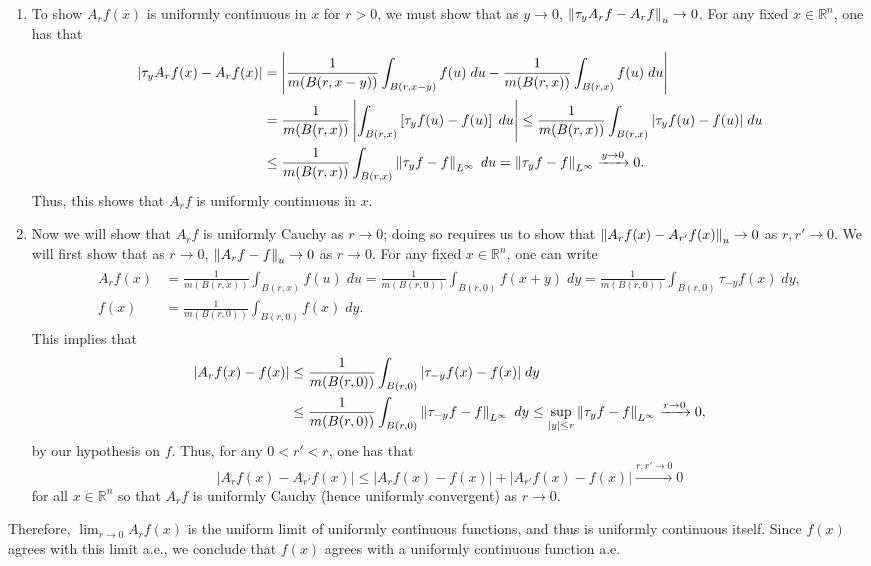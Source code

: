 \documentclass{article}
\begin{document}
	\begin{enumerate}[itemsep =-2pt,label = (\arabic{*})]
		\item To show $A_{r}f(x)$ is uniformly continuous in $x$ for $r > 0$, we must show that as $y \to 0$, $\left\Vert \tau_{y}A_{r}f - A_{r}f \right\Vert_{u} \to 0$. For any fixed $x \in \mathbb{R}^{n}$, one has that 
		\begin{align*}
			\begin{split}
				|\tau_{y}A_{r}f(x) - A_{r}f(x)| &= \left| \frac{1}{m(B(r,x - y))}\int_{B(r,x - y)}f(u)\;du - \frac{1}{m(B(r,x))}\int_{B(r,x)}f(u)\;du \right| \\
				&= \frac{1}{m(B(r, x))}\left| \int_{B(r, x)}\left[\tau_{y}f(u) - f(u)\right]\;du \right| \leq \frac{1}{m(B(r,x))}\int_{B(r,x)}|\tau_{y}f(u)- f(u)|\;du\\
				&\leq \frac{1}{m(B(r,x))}\int_{B(r, x)}\left\Vert \tau_{y}f - f \right\Vert_{L^{\infty}}\;du = \left\Vert \tau_{y}f - f \right\Vert_{L^{\infty}} \xrightarrow{y \to 0} 0. 
			\end{split}
		\end{align*}
		Thus, this shows that $A_{r}f$ is uniformly continuous in $x$. 
		\item Now we will show that $A_{r}f$ is uniformly Cauchy as $r \to 0$; doing so requires us to show that $\left\Vert A_{r}f(x) - A_{r'}f(x) \right\Vert_{u} \to 0$ as $r, r' \to 0$. We will first show that as $r \to 0$, $\left\Vert A_{r}f - f \right\Vert_{u} \to 0$ as $r \to 0$. For any fixed $x \in \mathbb{R}^{n}$, one can write 
		\begin{align*}
			\begin{split}
				A_{r}f(x) &= \frac{1}{m(B(r,x))}\int_{B(r,x)}f(u)\;du = \frac{1}{m(B(r,0))}\int_{B(r,0)}f(x + y)\;dy = \frac{1}{m(B(r,0))}\int_{B(r,0)}\tau_{-y}f(x)\;dy,\\
				f(x) &= \frac{1}{m(B(r,0))}\int_{B(r,0)}f(x)\;dy.
			\end{split}
		\end{align*}
		This implies that 
		\begin{align*}
			\begin{split}
				|A_{r}f(x) - f(x)| &\leq \frac{1}{m(B(r,0))}\int_{B(r,0)}|\tau_{-y}f(x) - f(x)|\;dy \\
				&\leq \frac{1}{m(B(r,0))}\int_{B(r,0)}\left\Vert \tau_{-y}f - f \right\Vert_{L^{\infty}}\;dy \leq \sup_{|y|\leq r}\left\Vert \tau_{y}f - f \right\Vert_{L^{\infty}} \xrightarrow{r \to 0} 0, 
			\end{split}
		\end{align*}
		by our hypothesis on $f$. Thus, for any $0 < r' < r$, one has that 
		\begin{equation*}
			|A_{r}f(x)- A_{r'}f(x)| \leq |A_{r}f(x) - f(x)| + |A_{r'}f(x) - f(x)| \xrightarrow{r, r' \to 0} 0
		\end{equation*}
		for all $x \in \mathbb{R}^{n}$ so that $A_{r}f$ is uniformly Cauchy (hence uniformly convergent) as $r \to 0$. 
	\end{enumerate}
	Therefore, $\lim_{r \to 0}A_{r}f(x)$ is the uniform limit of uniformly continuous functions, and thus is uniformly continuous itself. Since $f(x)$ agrees with this limit a.e., we conclude that $f(x)$ agrees with a uniformly continuous function a.e. 
	
\end{document}
